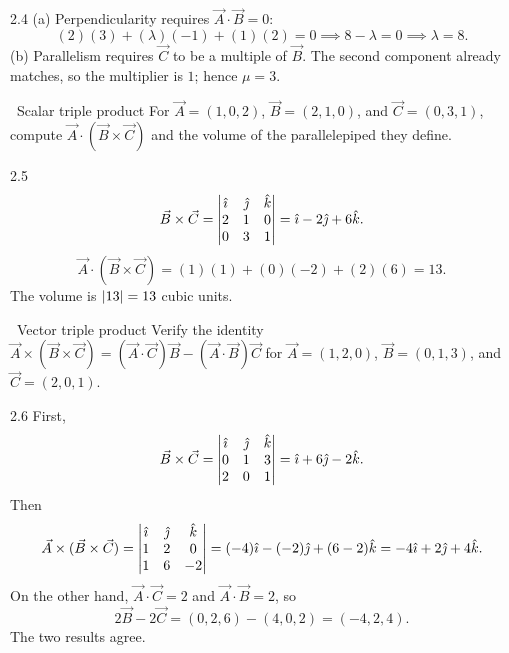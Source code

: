 \begin{tabletworkspace}[6.5cm]
\end{tabletworkspace}

\begin{solution}{2.4}
(a) Perpendicularity requires $\vec A\cdot\vec B=0$:
\[
(2)(3)+(\lambda)(-1)+(1)(2)=0
\implies 8-\lambda=0
\implies \lambda=8.
\]
(b) Parallelism requires $\vec C$ to be a multiple of $\vec B$. The second
component already matches, so the multiplier is $1$; hence $\mu=3$.
\end{solution}

\begin{exercise}{\core\ Scalar triple product}
For $\vec A=(1,0,2)$, $\vec B=(2,1,0)$, and $\vec C=(0,3,1)$, compute
$\vec A\cdot(\vec B\times\vec C)$ and the volume of the parallelepiped they
define.
\end{exercise}

\begin{tabletworkspace}[6.5cm]
\end{tabletworkspace}

\begin{solution}{2.5}
\[
\vec B\times\vec C=
\begin{vmatrix}
\hat{\imath}&\hat{\jmath}&\hat{k}\\
2&1&0\\
0&3&1
\end{vmatrix}
=\hat{\imath}-2\hat{\jmath}+6\hat{k}.
\]
\[
\vec A\cdot(\vec B\times\vec C)
=(1)(1)+(0)(-2)+(2)(6)=13.
\]
The volume is $\left\lvert 13 \right\rvert=13$ cubic units.
\end{solution}

\begin{exercise}{\core\ Vector triple product}
Verify the identity
$\vec A\times(\vec B\times\vec C)=(\vec A\cdot\vec C)\vec B-(\vec A\cdot\vec B)\vec C$
for $\vec A=(1,2,0)$, $\vec B=(0,1,3)$, and $\vec C=(2,0,1)$.
\end{exercise}

\begin{tabletworkspace}[6.5cm]
\end{tabletworkspace}

\begin{solution}{2.6}
First,
\[
\vec B\times\vec C=
\begin{vmatrix}
\hat{\imath}&\hat{\jmath}&\hat{k}\\
0&1&3\\
2&0&1
\end{vmatrix}
=\hat{\imath}+6\hat{\jmath}-2\hat{k}.
\]
Then
\[
\vec A\times(\vec B\times\vec C)=
\begin{vmatrix}
\hat{\imath}&\hat{\jmath}&\hat{k}\\
1&2&0\\
1&6&-2
\end{vmatrix}
=(-4)\hat{\imath}-( -2)\hat{\jmath}+(6-2)\hat{k}
=-4\hat{\imath}+2\hat{\jmath}+4\hat{k}.
\]
On the other hand, $\vec A\cdot\vec C=2$ and $\vec A\cdot\vec B=2$, so
\[
2\vec B-2\vec C=(0,2,6)-(4,0,2)=(-4,2,4).
\]
The two results agree.
\end{solution}

